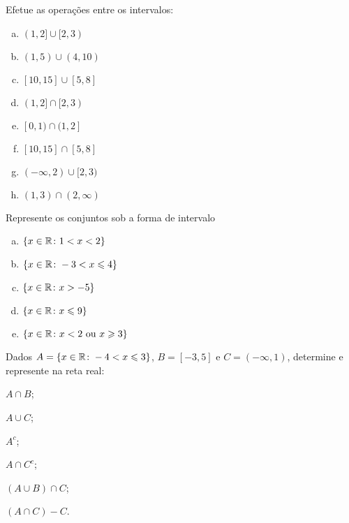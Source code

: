 


\newpage

\begin{secExercicios}

\begin{exer}
    Efetue as operações entre os intervalos:
    \begin{multicols}{2}
    \begin{enumerate}[a)]
        \item $(1,2]\cup [2,3)$
        \item $(1,5)\cup (4,10)$
        \item $[10,15]\cup[5,8]$
        \item $(1,2]\cap [2,3)$
        \item $[0,1)\cap (1,2]$
        \item $[10,15]\cap[5,8]$
        \item $(-\infty,2)\cup [2,3)$
        \item $(1,3)\cap (2,\infty)$
    \end{enumerate}
    \end{multicols}
\end{exer}

\begin{exer}
    Represente os conjuntos sob a forma de intervalo
    \begin{enumerate}[a)]
        \item $\{x\in\mathbb{R}\colon 1<x<2\}$
        \item $\{x\in\mathbb{R}\colon -3<x\leqslant 4\}$
        \item $\{x\in\mathbb{R}\colon x>-5\}$
        \item $\{x\in\mathbb{R}\colon x\leqslant 9\}$
        \item $\{x\in\mathbb{R}\colon x<2 \mbox{ ou } x\geqslant 3\}$
    \end{enumerate}
\end{exer}

\begin{exer}
    Dados $A=\{x\in\mathbb{R} \colon -4 < x \leqslant 3\}$, $B=[-3,5]$ e $C=(-\infty, 1)$, determine e represente na reta real:
    \begin{enumerate}[a)]
    \begin{multicols}{2}
        \item $A\cap B$;
        \item $A\cup C$;
        \item $A^c$;
        \item $A\cap C^c$;
        \item $(A\cup B)\cap C$;
        \item $(A\cap C)-C$.
    \end{multicols}
    \end{enumerate}
\end{exer}


\end{secExercicios}
